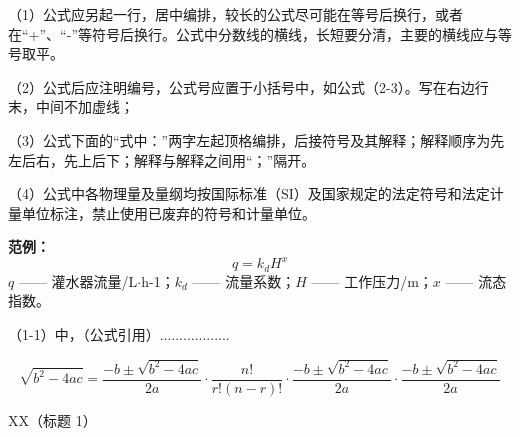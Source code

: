 \documentclass[UTF8, scheme=chinese, openany, oneside]{ctexbook}
\begin{document}
\vspace{4em}

（1）公式应另起一行，居中编排，较长的公式尽可能在等号后换行，或者在“+”、“-”等符号后换行。公式中分数线的横线，长短要分清，主要的横线应与等号取平。

（2）公式后应注明编号，公式号应置于小括号中，如公式（2-3）。写在右边行末，中间不加虚线；

（3）公式下面的“式中：”两字左起顶格编排，后接符号及其解释；解释顺序为先左后右，先上后下；解释与解释之间用“；”隔开。

（4）公式中各物理量及量纲均按国际标准（SI）及国家规定的法定符号和法定计量单位标注，禁止使用已废弃的符号和计量单位。

\noindent \textbf{范例：}
\begin{equation}
    q = k_d H^x \label{eq:1-1}
\end{equation}
$q$ —— 灌水器流量/L$\cdot$h-1；$k_d$ —— 流量系数；$H$ —— 工作压力/m；$x$ —— 流态指数。


\clearpage %


\noindent （1-1）中，（公式引用）..................

\vspace{2em}
\begin{equation}
    \sqrt{b^2-4ac} = \frac{-b \pm \sqrt{b^2-4ac}}{2a} \cdot \frac{n!}{r!(n-r)!} \cdot \frac{-b \pm \sqrt{b^2-4ac}}{2a} \cdot \frac{-b \pm \sqrt{b^2-4ac}}{2a} \label{eq:1-2}
\end{equation}

\vfill

\clearpage
\setcounter{chapter}{1} %
\setcounter{page}{6}    %


\vspace{1cm}
\begin{center}
    { \quad XX（标题 1）}
\end{center}
\vspace{0.8cm}
\end{document}
